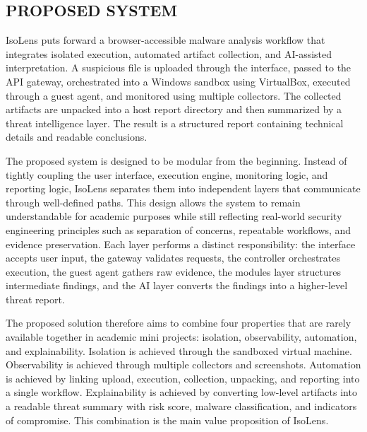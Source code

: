 \documentclass[a4paper,12pt,oneside]{report}
\begin{document}
\subsection{PROPOSED SYSTEM}
IsoLens puts forward a browser-accessible malware analysis workflow that integrates isolated execution, automated artifact collection, and AI-assisted interpretation. A suspicious file is uploaded through the interface, passed to the API gateway, orchestrated into a Windows sandbox using VirtualBox, executed through a guest agent, and monitored using multiple collectors. The collected artifacts are unpacked into a host report directory and then summarized by a threat intelligence layer. The result is a structured report containing technical details and readable conclusions.

\par

\par

The proposed system is designed to be modular from the beginning. Instead of tightly coupling the user interface, execution engine, monitoring logic, and reporting logic, IsoLens separates them into independent layers that communicate through well-defined paths. This design allows the system to remain understandable for academic purposes while still reflecting real-world security engineering principles such as separation of concerns, repeatable workflows, and evidence preservation. Each layer performs a distinct responsibility: the interface accepts user input, the gateway validates requests, the controller orchestrates execution, the guest agent gathers raw evidence, the modules layer structures intermediate findings, and the AI layer converts the findings into a higher-level threat report.

\par

\par

The proposed solution therefore aims to combine four properties that are rarely available together in academic mini projects: isolation, observability, automation, and explainability. Isolation is achieved through the sandboxed virtual machine. Observability is achieved through multiple collectors and screenshots. Automation is achieved by linking upload, execution, collection, unpacking, and reporting into a single workflow. Explainability is achieved by converting low-level artifacts into a readable threat summary with risk score, malware classification, and indicators of compromise. This combination is the main value proposition of IsoLens.
\end{document}
